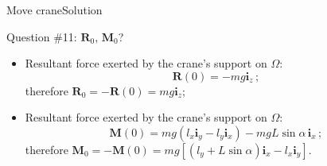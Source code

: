 \documentclass{beamer}
\newcommand{\xj}{x}
\newcommand{\yj}{y}
\newcommand{\zj}{z}
\renewcommand{\ij}{i}
\newcommand{\iv}{{\boldsymbol\ij}}
\newcommand{\medium}{\Omega}
\newcommand{\Fresj}{R}
\newcommand{\Mresj}{M}
\newcommand{\Fres}{{\boldsymbol\Fresj}}
\newcommand{\Mres}{{\boldsymbol\Mresj}}
\begin{document}
\begin{frame}{Move crane}{Solution}

\begin{exampleblock}{Question \#11: $\Fres_0$, $\Mres_0$?}
\begin{itemize}
\item Resultant force exerted by the crane's support on $\medium$:
\begin{displaymath}
\Fres(0)=-mg\iv_\zj\,;
\end{displaymath}
therefore $\Fres_0=-\Fres(0)=mg\iv_\zj$;
\item Resultant force exerted by the crane's support on $\medium$:
\begin{displaymath}
\Mres(0) =mg(l_\xj\iv_\yj-l_\yj\iv_\xj)-mgL\sin\alpha\,\iv_\xj\,;
\end{displaymath}
therefore $\Mres_0=-\Mres(0)=mg[(l_\yj+L\sin\alpha)\iv_\xj-l_\xj\iv_\yj]$.
\end{itemize}
\end{exampleblock}

\end{frame}
\end{document}
